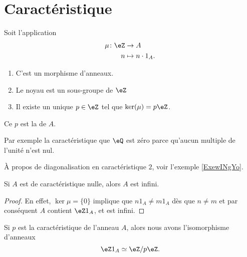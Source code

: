 \section{Caractéristique}

\begin{lemmaDef}        \label{LEMDEFooVEWZooUrPaDw}
    Soit l'application
    \begin{equation}
        \begin{aligned}
            \mu\colon \eZ&\to A \\
            n&\mapsto n\cdot 1_A .
        \end{aligned}
    \end{equation}
    \begin{enumerate}
        \item
            C'est un morphisme d'anneaux.
        \item
            Le noyau est un sous-groupe de \( \eZ\)
        \item
            Il existe un unique \( p\in \eZ\) tel que \( \ker(\mu)=p\eZ\).
    \end{enumerate}
    Ce \( p\) est la  de \( A\).
\end{lemmaDef}

Par exemple la caractéristique que \( \eQ\) est zéro parce qu'aucun multiple de l'unité n'est nul.

À propos de diagonalisation en caractéristique \( 2\), voir l'exemple \ref{ExewINgYo}.

\begin{lemma}
    Si \( A\) est de caractéristique nulle, alors \( A\) est infini.
\end{lemma}

\begin{proof}
    En effet, \( \ker\mu=\{0\} \) implique que \( n1_A \neq  m1_A\) dès que \(n \neq m \) et par conséquent \( A\) contient \(\eZ 1_A \), et  est infini.
\end{proof}

\begin{lemma}       \label{LemHmDaYH}
    Si \( p\) est la caractéristique de l'anneau \( A\), alors nous avons l'isomorphisme d'anneaux
    \begin{equation}
         \eZ 1_A\simeq\eZ/p\eZ.
    \end{equation}
\end{lemma}

